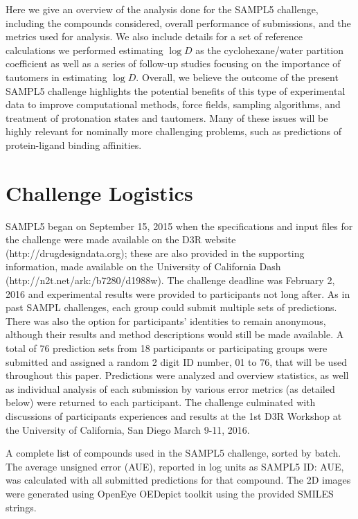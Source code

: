 Here we give an overview of the analysis done for the SAMPL5 challenge, including the compounds considered, overall performance of submissions, and the metrics used for analysis. 
We also include details for a set of reference calculations we performed estimating $\log D$ as the cyclohexane/water partition coefficient as well as a series of follow-up studies focusing on the importance of tautomers in estimating $\log D$.
Overall, we believe the outcome of the present SAMPL5 challenge highlights the potential benefits of this type of experimental data to improve computational methods, force fields, sampling algorithms, and treatment of protonation states and tautomers.
Many of these issues will be highly relevant for nominally more challenging problems, such as predictions of protein-ligand binding affinities.
 
\section{Challenge Logistics}
\label{logistics}
SAMPL5 began on September 15, 2015
when the specifications and input files for the challenge were made available on the D3R website (http://drugdesigndata.org); these are also provided in the supporting information, made available on the University of California Dash (http://n2t.net/ark:/b7280/d1988w).
The challenge deadline was February 2, 2016 and experimental results were provided to participants not long after. 
As in past SAMPL challenges, each group could submit multiple sets of predictions.
There was also the option for participants' identities to remain anonymous, although their results and method descriptions would still be made available.  
A total of 76 prediction sets from 18 participants or participating groups were submitted and assigned a random 2 digit ID number, 01 to 76, that will be used throughout this paper. 
Predictions were analyzed and overview statistics, as well as individual analysis of each submission by various error metrics (as detailed below) were returned to each participant. 
The challenge culminated with discussions of participants experiences and results at the 1st D3R Workshop at the University of California, San Diego March 9-11, 2016.

\begin{table}

\label{MoleculeTable}
\caption{A complete list of compounds used in the SAMPL5 challenge, sorted by batch. The average unsigned error (AUE), reported in log units as SAMPL5 ID: AUE, was calculated with all submitted predictions for that compound. The 2D images were generated using OpenEye OEDepict toolkit  \cite{openeye} using the provided SMILES strings.} 
\end{table}

